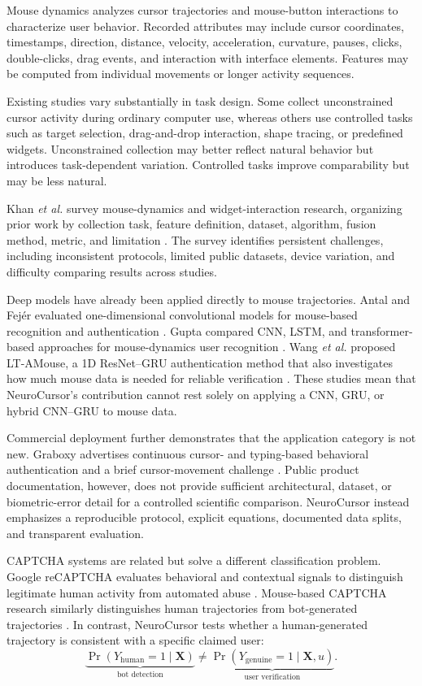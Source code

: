 \documentclass[conference]{IEEEtran}
\begin{document}
Mouse dynamics analyzes cursor trajectories and mouse-button interactions to
characterize user behavior. Recorded attributes may include cursor
coordinates, timestamps, direction, distance, velocity, acceleration,
curvature, pauses, clicks, double-clicks, drag events, and interaction with
interface elements. Features may be computed from individual movements or
longer activity sequences.

Existing studies vary substantially in task design. Some collect
unconstrained cursor activity during ordinary computer use, whereas others
use controlled tasks such as target selection, drag-and-drop interaction,
shape tracing, or predefined widgets. Unconstrained collection may better
reflect natural behavior but introduces task-dependent variation. Controlled
tasks improve comparability but may be less natural.

Khan \textit{et al.} survey mouse-dynamics and widget-interaction research,
organizing prior work by collection task, feature definition, dataset,
algorithm, fusion method, metric, and limitation
\cite{khanMouseSurvey}. The survey identifies persistent challenges,
including inconsistent protocols, limited public datasets, device variation,
and difficulty comparing results across studies.

Deep models have already been applied directly to mouse trajectories. Antal
and Fej\'er evaluated one-dimensional convolutional models for mouse-based
recognition and authentication \cite{antalMouseCNN}. Gupta compared CNN,
LSTM, and transformer-based approaches for mouse-dynamics user recognition
\cite{guptaMouseRecognition}. Wang \textit{et al.} proposed LT-AMouse, a
1D ResNet--GRU authentication method that also investigates how much mouse
data is needed for reliable verification \cite{wangLTAMouse}. These studies
mean that NeuroCursor's contribution cannot rest solely on applying a CNN,
GRU, or hybrid CNN--GRU to mouse data.

Commercial deployment further demonstrates that the application category is
not new. Graboxy advertises continuous cursor- and typing-based behavioral
authentication and a brief cursor-movement challenge
\cite{graboxyContinuous}. Public product documentation, however, does not
provide sufficient architectural, dataset, or biometric-error detail for a
controlled scientific comparison. NeuroCursor instead emphasizes a
reproducible protocol, explicit equations, documented data splits, and
transparent evaluation.

CAPTCHA systems are related but solve a different classification problem.
Google reCAPTCHA evaluates behavioral and contextual signals to distinguish
legitimate human activity from automated abuse \cite{googleRecaptcha}.
Mouse-based CAPTCHA research similarly distinguishes human trajectories from
bot-generated trajectories \cite{becaptchaMouse}. In contrast, NeuroCursor
tests whether a human-generated trajectory is consistent with a specific
claimed user:
\begin{equation}
\underbrace{\Pr(Y_{\mathrm{human}}=1\mid\mathbf{X})}_{\text{bot detection}}
\neq
\underbrace{\Pr(Y_{\mathrm{genuine}}=1\mid\mathbf{X},u)}_{\text{user verification}}.
\label{eq:captcha_verification_distinction}
\end{equation}
\end{document}
